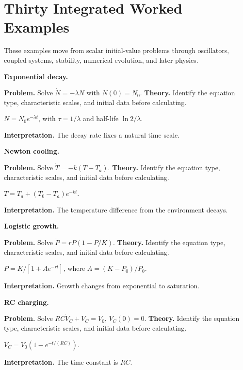 \section{Thirty Integrated Worked Examples}
\label{sec:ch4-worked-examples}

These examples move from scalar initial-value problems through oscillators, coupled systems, stability, numerical evolution, and later physics.

\begin{workedexample}
\textbf{Exponential decay.}\par
\textbf{Problem.} Solve $\dot N=-\lambda N$ with $N(0)=N_0$.
\textbf{Theory.} Identify the equation type, characteristic scales, and initial data before calculating.
\begin{solution}
$N=N_0e^{-\lambda t}$, with $\tau=1/\lambda$ and half-life $\ln2/\lambda$.

\textbf{Interpretation.} The decay rate fixes a natural time scale.
\end{solution}
\end{workedexample}

\begin{workedexample}
\textbf{Newton cooling.}\par
\textbf{Problem.} Solve $\dot T=-k(T-T_a)$.
\textbf{Theory.} Identify the equation type, characteristic scales, and initial data before calculating.
\begin{solution}
$T=T_a+(T_0-T_a)e^{-kt}$.

\textbf{Interpretation.} The temperature difference from the environment decays.
\end{solution}
\end{workedexample}

\begin{workedexample}
\textbf{Logistic growth.}\par
\textbf{Problem.} Solve $\dot P=rP(1-P/K)$.
\textbf{Theory.} Identify the equation type, characteristic scales, and initial data before calculating.
\begin{solution}
$P=K/[1+A e^{-rt}]$, where $A=(K-P_0)/P_0$.

\textbf{Interpretation.} Growth changes from exponential to saturation.
\end{solution}
\end{workedexample}

\begin{workedexample}
\textbf{RC charging.}\par
\textbf{Problem.} Solve $RC\dot V_C+V_C=V_0$, $V_C(0)=0$.
\textbf{Theory.} Identify the equation type, characteristic scales, and initial data before calculating.
\begin{solution}
$V_C=V_0(1-e^{-t/(RC)})$.

\textbf{Interpretation.} The time constant is $RC$.
\end{solution}
\end{workedexample}

